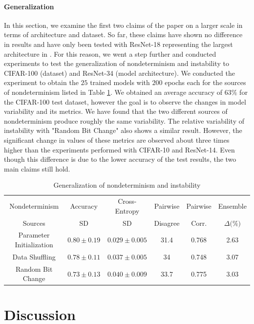 \paragraph{Generalization}
In this section, we examine the first two claims of the paper on a larger scale in terms of architecture and dataset. So far, these claims have shown no difference in results and have only been tested with ResNet-18 representing the largest architecture in \citep{summers2021nondeterminism}. For this reason, we went a step further and conducted experiments to test the generalization of nondeterminism and instability to CIFAR-100 (dataset) and ResNet-34 (model architecture). We conducted the experiment to obtain the $25$ trained models with $200$ epochs each for the sources of nondeterminism listed in Table \ref{table:table10}. We obtained an average accuracy of $63\%$ for the CIFAR-100 test dataset, however the goal is to observe the changes in model variability and its metrics.  We have found that the two different sources of nondeterminism produce roughly the same variability. The relative variability of instability with "Random Bit Change" also shows a similar result. However, the significant change in values of these metrics are observed about three times higher than the experiments performed with CIFAR-10 and ResNet-14. Even though this difference is due to the lower accuracy of the test results, the two main claims still hold.

\begin{table}[!htb]
\centering
	\begin{tabular}{c|c|c|c|c|c}
	\hline
    Nondeterminism  & Accuracy & Cross-Entropy & Pairwise  & Pairwise & Ensemble \\
    Sources & SD \text{(\%)} & SD \text{(\%)} & Disagree \text{(\%)} & Corr. & $\Delta \text{(\%)}$\\
	\hline
		Parameter Initialization & $0.80 \pm 0.19$  & $0.029 \pm 0.005$  &  31.4 & 0.768 & 2.63  \\
	    Data Shuffling & $0.78 \pm 0.11$ & $0.037 \pm 0.005$  &  34 & 0.748 & 3.07   \\
	\hline    
	    Random Bit Change & $0.73 \pm 0.13$ & $0.040 \pm 0.009$  &  33.7 & 0.775 & 3.03 \\
		\hline
	\end{tabular}
	\caption{Generalization of nondeterminism and instability}
	\label{table:table10}
\end{table}
\section{Discussion}
\label{sec:Discussion}

